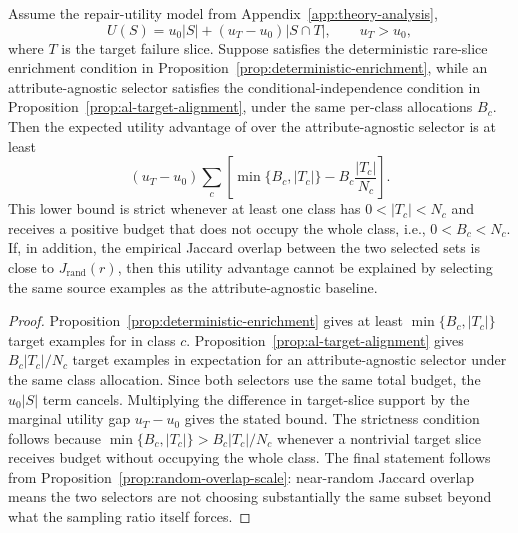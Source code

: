 \begin{tcolorbox}[
    colback=blue!2!white,
    colframe=blue!20!white,
    arc=3pt,
    boxrule=1pt,
    drop shadow,
    breakable
]
\begin{proposition}
\label{prop:nonredundant-utility}
Assume the repair-utility model from Appendix~\ref{app:theory-analysis},
\begin{equation}
U(S)=u_0|S|+(u_T-u_0)|S\cap T|,\qquad u_T>u_0,
\end{equation}
where $T$ is the target failure slice. Suppose \model satisfies the deterministic rare-slice enrichment condition in Proposition~\ref{prop:deterministic-enrichment}, while an attribute-agnostic selector satisfies the conditional-independence condition in Proposition~\ref{prop:al-target-alignment}, under the same per-class allocations $B_c$. Then the expected utility advantage of \model over the attribute-agnostic selector is at least
\begin{equation}
(u_T-u_0)
\sum_c
\left[
\min\{B_c,|T_c|\}
-
B_c\frac{|T_c|}{N_c}
\right].
\end{equation}
This lower bound is strict whenever at least one class has $0<|T_c|<N_c$ and receives a positive budget that does not occupy the whole class, i.e., $0<B_c<N_c$. If, in addition, the empirical Jaccard overlap between the two selected sets is close to $J_{\mathrm{rand}}(r)$, then this utility advantage cannot be explained by selecting the same source examples as the attribute-agnostic baseline.
\end{proposition}
\end{tcolorbox}

\begin{tcolorbox}[
    colback=green!2!white,
    colframe=green!20!white,
    arc=3pt,
    boxrule=1pt,
    drop shadow,
    breakable
]
\begin{proof}
Proposition~\ref{prop:deterministic-enrichment} gives at least $\min\{B_c,|T_c|\}$ target examples for \model in class $c$. Proposition~\ref{prop:al-target-alignment} gives $B_c|T_c|/N_c$ target examples in expectation for an attribute-agnostic selector under the same class allocation. Since both selectors use the same total budget, the $u_0|S|$ term cancels. Multiplying the difference in target-slice support by the marginal utility gap $u_T-u_0$ gives the stated bound. The strictness condition follows because $\min\{B_c,|T_c|\}>B_c|T_c|/N_c$ whenever a nontrivial target slice receives budget without occupying the whole class. The final statement follows from Proposition~\ref{prop:random-overlap-scale}: near-random Jaccard overlap means the two selectors are not choosing substantially the same subset beyond what the sampling ratio itself forces.
\end{proof}
\end{tcolorbox}

